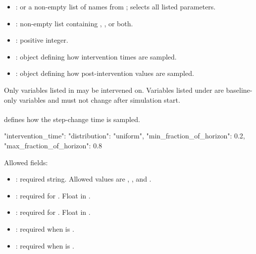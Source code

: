 \documentclass[11pt]{article}
\begin{document}
\begin{itemize}
\item {}:  or a non-empty list of names from ;  selects all listed parameters.
\item {}: non-empty list containing , , or both.
\item {}: positive integer.
\item {}: object defining how intervention times are sampled.
\item {}: object defining how post-intervention values are sampled.
\end{itemize}

Only variables listed in  may be intervened on.
Variables listed under  are baseline-only variables and must not change after simulation start.

\paragraph{\texorpdfstring{}{intervention\_time}}

 defines how the step-change time is sampled.

\begin{DocCode}
"intervention_time": {
  "distribution": "uniform",
  "min_fraction_of_horizon": 0.2,
  "max_fraction_of_horizon": 0.8
}
\end{DocCode}

Allowed fields:

\begin{itemize}
\item {}: required string. Allowed values are , , and .
\item {}: required for . Float in \code{[0,1]}.
\item {}: required for . Float in \code{[0,1]}.
\item {}: required when  is .
\item {}: required when  is .
\end{itemize}
\end{document}
